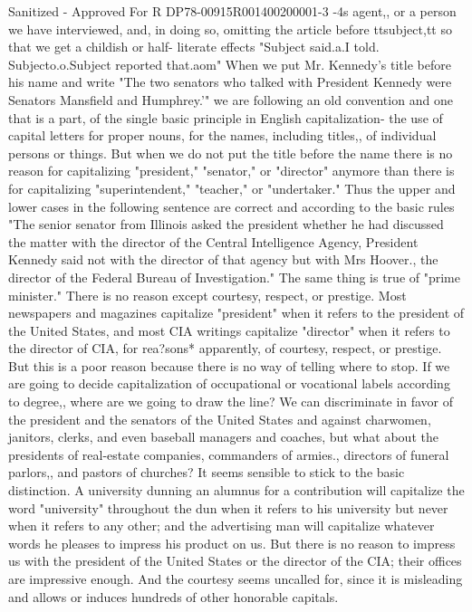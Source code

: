 \documentclass[
    oneside,
    11pt,
    draft
]{memoir}
\begin{document}
Sanitized - Approved For R DP78-00915R001400200001-3 -4s agent,, or a person we have interviewed, and, in doing so, omitting the article before ttsubject,tt so that we get a childish or half- literate effects "Subject said.a.I told. Subjecto.o.Subject reported that.aom" When we put Mr. Kennedy's title before his name and write "The two senators who talked with President Kennedy were Senators Mansfield and Humphrey.'" we are following an old convention and one that is a part, of the single basic principle in English capitalization- the use of capital letters for proper nouns, for the names, including titles,, of individual persons or things. But when we do not put the title before the name there is no reason for capitalizing "president," "senator," or "director" anymore than there is for capitalizing "superintendent," "teacher," or "undertaker." Thus the upper and lower cases in the following sentence are correct and according to the basic rules "The senior senator from Illinois asked the president whether he had discussed the matter with the director of the Central Intelligence Agency, President Kennedy said not with the director of that agency but with Mrs Hoover., the director of the Federal Bureau of Investigation." The same thing is true of "prime minister." There is no reason except courtesy, respect, or prestige. Most newspapers and magazines capitalize "president" when it refers to the president of the United States, and most CIA writings capitalize "director" when it refers to the director of CIA, for rea?sons* apparently, of courtesy, respect, or prestige. But this is a poor reason because there is no way of telling where to stop. If we are going to decide capitalization of occupational or vocational labels according to degree,, where are we going to draw the line? We can discriminate in favor of the president and the senators of the United States and against charwomen, janitors, clerks, and even baseball managers and coaches, but what about the presidents of real-estate companies, commanders of armies., directors of funeral parlors,, and pastors of churches? It seems sensible to stick to the basic distinction. A university dunning an alumnus for a contribution will capitalize the word "university" throughout the dun when it refers to his university but never when it refers to any other; and the advertising man will capitalize whatever words he pleases to impress his product on us. But there is no reason to impress us with the president of the United States or the director of the CIA; their offices are impressive enough. And the courtesy seems uncalled for, since it is misleading and allows or induces hundreds of other honorable capitals.
\end{document}
